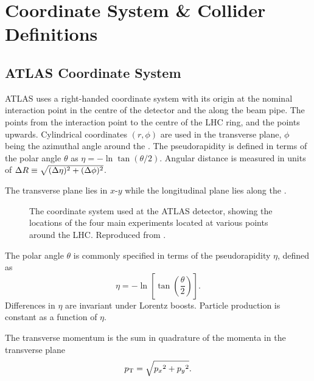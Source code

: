 \section{Coordinate System \& Collider Definitions}

\subsection{ATLAS Coordinate System}

ATLAS uses a right-handed coordinate system with its origin at the nominal interaction point in the centre of the detector and the  along the beam pipe. The  points from the interaction point to the centre of the LHC ring, and the  points upwards. Cylindrical coordinates \((r,\phi)\) are used in the transverse plane, \(\phi\) being the azimuthal angle around the . The pseudorapidity is defined in terms of the polar angle \(\theta\) as \(\eta = -\ln \tan(\theta/2)\). Angular distance is measured in units of \(\Delta R \equiv \sqrt{(\Delta\eta)^{2} + (\Delta\phi)^{2}}\).

The transverse plane lies in $x$\nobreakdash-$y$ while the longitudinal plane lies along the .
%
\begin{figure}[!htbp]
  \centering
  
  \caption{
    The coordinate system used at the ATLAS detector, showing the locations of the four main experiments located at various points around the LHC.
    Reproduced from .
  }
  \label{fig:atlas_coord_system}
\end{figure}

The polar angle $\theta$ is commonly specified in terms of the pseudorapidity $\eta$, defined as
%
\begin{equation}\label{eq:pseudorap}
  \eta = - \ln \left[ \tan \left( \frac{\theta}{2} \right) \right] .
\end{equation}
%
Differences in $\eta$ are invariant under Lorentz boosts. Particle production is constant as a function of $\eta$.

The transverse momentum \pt is the sum in quadrature of the momenta in the transverse plane
%
\begin{equation}\label{eq:pt}
  p_{\text{T}} = \sqrt{ {p_x}^2 + {p_y}^2 } .
\end{equation}

